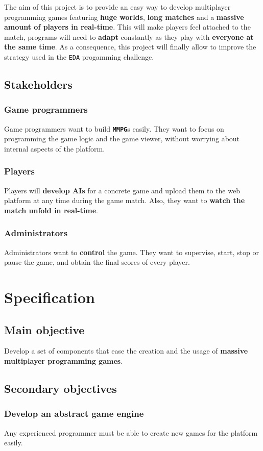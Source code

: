 \documentclass[a4paper,11pt,titlepage,abstract,numbers=noenddot,automark,mnsy,intlimits,rgb,dvipsnames]{report}
\begin{document}
The aim of this project is to provide an easy way to develop multiplayer programming games featuring \textbf{huge worlds},
\textbf{long matches} and a \textbf{massive amount of players in real-time}. This will make players feel attached to the match,
programs will need to \textbf{adapt} constantly as they play with \textbf{everyone at the same time}. As a consequence, this project will
finally allow to improve the strategy used in the \texttt{EDA} progamming challenge.
\section{Stakeholders}
\subsection{Game programmers}
Game programmers want to build \textbf{\texttt{MMPG}}s easily. They want to focus on programming the game logic and the
game viewer, without worrying about internal aspects of the platform.
\subsection{Players}
Players will \textbf{develop \texttt{}AI\texttt{}s} for a concrete game and upload them to the web platform at any time during the game match.
Also, they want to \textbf{watch the match unfold in real-time}.
\subsection{Administrators}
Administrators want to \textbf{control} the game. They want to supervise, start,
stop or pause the game, and obtain the final scores of every player.
\clearpage
\chapter{Specification}
\section{Main objective}
Develop a set of components that ease the creation and the usage of \textbf{massive multiplayer programming games}.
\section{Secondary objectives}
\subsection{Develop an abstract game engine}
Any experienced programmer must be able to create new games for the platform easily.
\end{document}
